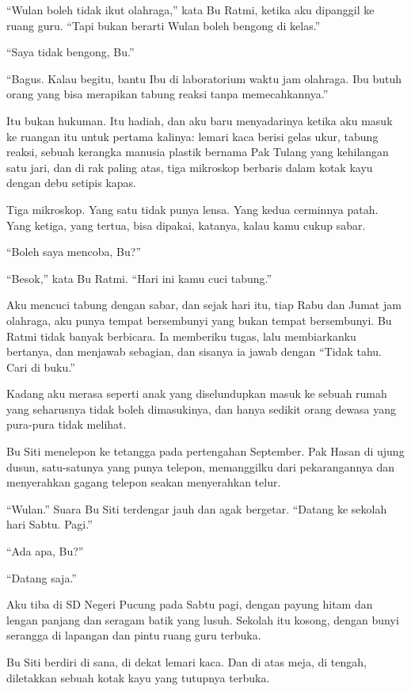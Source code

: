 \documentclass[11pt,twoside,openany]{book}
\makeatletter
\newcommand{\scenebreak}{\par\vspace{0.9em}{\centering\textsc{*\hspace{0.7em}*\hspace{0.7em}*}\par}\vspace{0.9em}\@afterindentfalse\@afterheading}
\makeatother
\begin{document}
``Wulan boleh tidak ikut olahraga,'' kata Bu Ratmi, ketika aku dipanggil ke ruang guru. ``Tapi bukan berarti Wulan boleh bengong di kelas.''

``Saya tidak bengong, Bu.''

``Bagus. Kalau begitu, bantu Ibu di laboratorium waktu jam olahraga. Ibu butuh orang yang bisa merapikan tabung reaksi tanpa memecahkannya.''

Itu bukan hukuman. Itu hadiah, dan aku baru menyadarinya ketika aku masuk ke ruangan itu untuk pertama kalinya: lemari kaca berisi gelas ukur, tabung reaksi, sebuah kerangka manusia plastik bernama Pak Tulang yang kehilangan satu jari, dan di rak paling atas, tiga mikroskop berbaris dalam kotak kayu dengan debu setipis kapas.

Tiga mikroskop. Yang satu tidak punya lensa. Yang kedua cerminnya patah. Yang ketiga, yang tertua, bisa dipakai, katanya, kalau kamu cukup sabar.

``Boleh saya mencoba, Bu?''

``Besok,'' kata Bu Ratmi. ``Hari ini kamu cuci tabung.''

Aku mencuci tabung dengan sabar, dan sejak hari itu, tiap Rabu dan Jumat jam olahraga, aku punya tempat bersembunyi yang bukan tempat bersembunyi. Bu Ratmi tidak banyak berbicara. Ia memberiku tugas, lalu membiarkanku bertanya, dan menjawab sebagian, dan sisanya ia jawab dengan ``Tidak tahu. Cari di buku.''

Kadang aku merasa seperti anak yang diselundupkan masuk ke sebuah rumah yang seharusnya tidak boleh dimasukinya, dan hanya sedikit orang dewasa yang pura-pura tidak melihat.

\scenebreak
Bu Siti menelepon ke tetangga pada pertengahan September. Pak Hasan di ujung dusun, satu-satunya yang punya telepon, memanggilku dari pekarangannya dan menyerahkan gagang telepon seakan menyerahkan telur.

``Wulan.'' Suara Bu Siti terdengar jauh dan agak bergetar. ``Datang ke sekolah hari Sabtu. Pagi.''

``Ada apa, Bu?''

``Datang saja.''

Aku tiba di SD Negeri Pucung pada Sabtu pagi, dengan payung hitam dan lengan panjang dan seragam batik yang lusuh. Sekolah itu kosong, dengan bunyi serangga di lapangan dan pintu ruang guru terbuka.

Bu Siti berdiri di sana, di dekat lemari kaca. Dan di atas meja, di tengah, diletakkan sebuah kotak kayu yang tutupnya terbuka.
\end{document}
